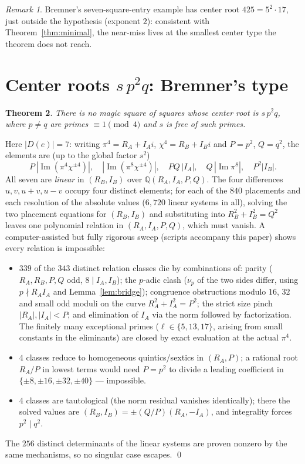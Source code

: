 \documentclass[11pt]{article}
\newtheorem{theorem}{Theorem}
\theoremstyle{remark}
\newtheorem{remark}[theorem]{Remark}
\DeclareMathOperator{\im}{Im}
\begin{document}
\begin{remark}
Bremner's seven-square-entry example has center root $425 = 5^2\cdot 17$,
just outside the hypothesis (exponent $2$): consistent with
Theorem~\ref{thm:minimal}, the near-miss lives at the smallest center type
the theorem does not reach.
\end{remark}

\section{Center roots $s\,p^2q$: Bremner's type}

\begin{theorem}\label{thm:F}
There is no magic square of squares whose center root is $s\,p^2q$, where
$p\neq q$ are primes $\equiv 1\pmod 4$ and $s$ is free of such primes.
\end{theorem}

Here $|D(e)|=7$: writing $\pi^4=R_A+I_Ai$, $\chi^4=R_B+I_Bi$ and $P=p^2$,
$Q=q^2$, the elements are (up to the global factor $s^2$)
\[
P\,|\!\im(\pi^4\chi^{\pm4})|,\quad |\!\im(\pi^8\chi^{\pm4})|,\quad
PQ\,|I_A|,\quad Q\,|\!\im\pi^8|,\quad P^2|I_B| .
\]
All seven are \emph{linear} in $(R_B,I_B)$ over $\mathbb{Q}(R_A,I_A,P,Q)$.
The four differences $u,v,u+v,u-v$ occupy four distinct elements; for each of
the $840$ placements and each resolution of the absolute values ($6{,}720$
linear systems in all), solving the two placement equations for $(R_B,I_B)$
and substituting into $R_B^2+I_B^2=Q^2$ leaves one polynomial relation in
$(R_A,I_A,P,Q)$, which must vanish.  A computer-assisted but fully rigorous
sweep (scripts accompany this paper) shows every relation is impossible:

\begin{itemize}
\item $339$ of the $343$ distinct relation classes die by combinations of:
parity ($R_A,R_B,P,Q$ odd, $8\mid I_A,I_B$); the $p$-adic clash
($\nu_p$ of the two sides differ, using $p\nmid R_AI_A$ and
Lemma~\ref{lem:bridge}); congruence obstructions modulo $16$, $32$ and small
odd moduli on the curve $R_A^2+I_A^2=P^2$; the strict size pinch
$|R_A|,|I_A|<P$; and elimination of $I_A$ via the norm followed by
factorization.  The finitely many exceptional primes ($\ell\in\{5,13,17\}$,
arising from small constants in the eliminants) are closed by exact
evaluation at the actual $\pi^4$.
\item $4$ classes reduce to homogeneous quintics/sextics in $(R_A,P)$; a
rational root $R_A/P$ in lowest terms would need $P=p^2$ to divide a leading
coefficient in $\{\pm8,\pm16,\pm32,\pm40\}$ --- impossible.
\item $4$ classes are tautological (the norm residual vanishes identically);
there the solved values are $(R_B,I_B)=\pm(Q/P)(R_A,-I_A)$, and integrality
forces $p^2\mid q^2$.
\end{itemize}
The $256$ distinct determinants of the linear systems are proven nonzero by
the same mechanisms, so no singular case escapes.  \qed
\end{document}
